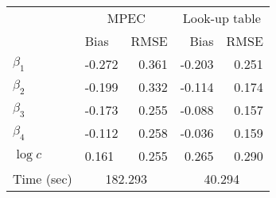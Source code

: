

\begin{tabular}[t]{llrrr}
\toprule
 & \multicolumn{2}{c}{MPEC} & \multicolumn{2}{c}{Look-up table}\\
  & Bias & RMSE & Bias & RMSE\\
\midrule
$\beta_{1}$ & -0.272 & 0.361 & -0.203 & 0.251\\
$\beta_{2}$ & -0.199 & 0.332 & -0.114 & 0.174\\
$\beta_{3}$ & -0.173 & 0.255 & -0.088 & 0.157\\
$\beta_{4}$ & -0.112 & 0.258 & -0.036 & 0.159\\
$\log c$ & 0.161 & 0.255 & 0.265 & 0.290\\
Time (sec) &  \multicolumn{2}{c}{182.293} &  \multicolumn{2}{c}{40.294}\\
\bottomrule
\end{tabular}
